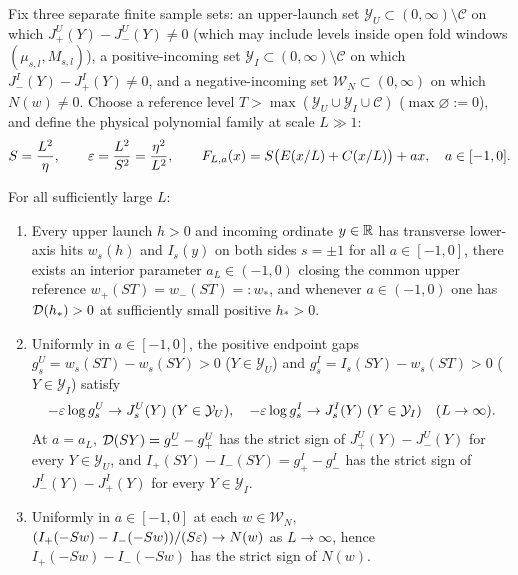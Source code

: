 Fix three separate finite sample sets: an upper-launch set $\mathcal{Y}_U\subset(0,\infty)\setminus\mathcal{C}$ on which $J_+^U(Y)-J_-^U(Y)\neq 0$ (which may include levels inside open fold windows $(\mu_{s,l},M_{s,l})$), a positive-incoming set $\mathcal{Y}_I\subset(0,\infty)\setminus\mathcal{C}$ on which $J_-^I(Y)-J_+^I(Y)\neq 0$, and a negative-incoming set $\mathcal{W}_N\subset(0,\infty)$ on which $N(w)\neq 0$. Choose a reference level $T>\max(\mathcal{Y}_U\cup\mathcal{Y}_I\cup\mathcal{C})$ ($\max\varnothing:=0$), and define the physical polynomial family at scale $L\gg 1$:
\begin{equation}\label{eq:quad-field}
  S = \frac{L^2}{\eta},\qquad \varepsilon = \frac{L^2}{S^2} = \frac{\eta^2}{L^2},\qquad
  F_{L,a}(x) = S\big(E(x/L)+C(x/L)\big) + ax,\quad a\in[-1,0].
\end{equation}

\begin{proposition}\label{prop:physical-quad}
For all sufficiently large $L$:
\begin{enumerate}
  \item[\textup{(i)}] Every upper launch $h>0$ and incoming ordinate $y\in\mathbb{R}$ has transverse lower-axis hits $w_s(h)$ and $I_s(y)$ on both sides $s=\pm 1$ for all $a\in[-1,0]$, there exists an interior parameter $a_L\in(-1,0)$ closing the common upper reference $w_+(ST)=w_-(ST)=:w_*$, and whenever $a\in(-1,0)$ one has $\mathcal{D}(h_*)>0$ at sufficiently small positive $h_*>0$.
  \item[\textup{(ii)}] Uniformly in $a\in[-1,0]$, the positive endpoint gaps $g_s^U=w_s(ST)-w_s(SY)>0$ ($Y\in\mathcal{Y}_U$) and $g_s^I=I_s(SY)-w_s(ST)>0$ ($Y\in\mathcal{Y}_I$) satisfy
  \begin{equation}\label{eq:log-gap-quad}
    -\varepsilon\log g_s^U \to J_s^U(Y)\ (Y\in\mathcal{Y}_U),\quad
    -\varepsilon\log g_s^I \to J_s^I(Y)\ (Y\in\mathcal{Y}_I)\quad (L\to\infty).
  \end{equation}
  At $a=a_L$, $\mathcal{D}(SY)=g_-^U-g_+^U$ has the strict sign of $J_+^U(Y)-J_-^U(Y)$ for every $Y\in\mathcal{Y}_U$, and $I_+(SY)-I_-(SY)=g_+^I-g_-^I$ has the strict sign of $J_-^I(Y)-J_+^I(Y)$ for every $Y\in\mathcal{Y}_I$.
  \item[\textup{(iii)}] Uniformly in $a\in[-1,0]$ at each $w\in\mathcal{W}_N$, $(I_+(-Sw)-I_-(-Sw))/(S\varepsilon)\to N(w)$ as $L\to\infty$, hence $I_+(-Sw)-I_-(-Sw)$ has the strict sign of $N(w)$.
\end{enumerate}
\end{proposition}

